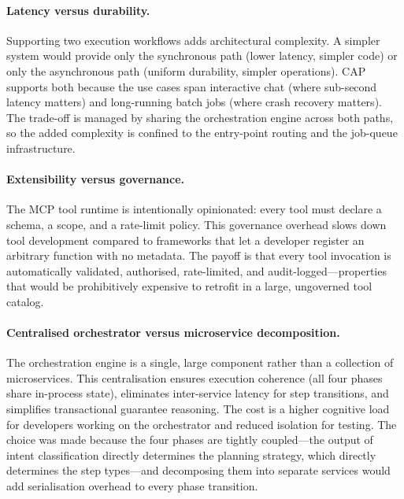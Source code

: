 \documentclass[a4paper]{sapthesis}
\begin{document}
\paragraph{Latency versus durability.}
Supporting two execution workflows adds architectural complexity.  A
simpler system would provide only the synchronous path (lower latency,
simpler code) or only the asynchronous path (uniform durability, simpler
operations).  CAP supports both because the use cases span interactive
chat (where sub-second latency matters) and long-running batch jobs
(where crash recovery matters).  The trade-off is managed by sharing the
orchestration engine across both paths, so the added complexity is
confined to the entry-point routing and the job-queue infrastructure.

\paragraph{Extensibility versus governance.}
The MCP tool runtime is intentionally opinionated: every tool must declare
a schema, a scope, and a rate-limit policy.  This governance overhead
slows down tool development compared to frameworks that let a developer
register an arbitrary function with no metadata.  The payoff is that every
tool invocation is automatically validated, authorised, rate-limited, and
audit-logged---properties that would be prohibitively expensive to
retrofit in a large, ungoverned tool catalog.

\paragraph{Centralised orchestrator versus microservice decomposition.}
The orchestration engine is a single, large component rather than a
collection of microservices.  This centralisation ensures execution
coherence (all four phases share in-process state), eliminates
inter-service latency for step transitions, and simplifies
transactional guarantee reasoning.  The cost is a higher cognitive load for
developers working on the orchestrator and reduced isolation for testing.
The choice was made because the four phases are tightly coupled---the
output of intent classification directly determines the planning strategy,
which directly determines the step types---and decomposing them into
separate services would add serialisation overhead to every phase
transition.
\end{document}
